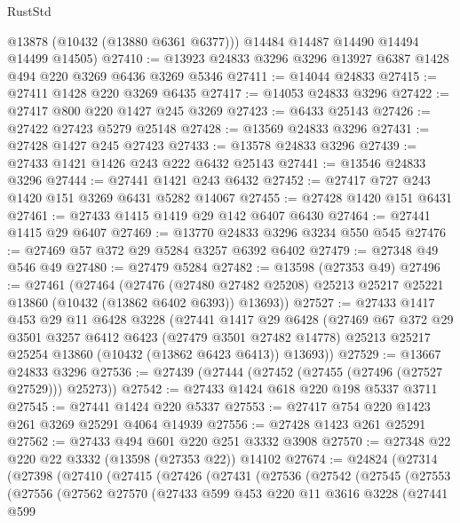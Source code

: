 \begin{lexlean}{RustStd}
\begin{coremodule}
        @13878
        (@10432 (@13880 @6361 @6377)))
      @14484
      @14487
      @14490
      @14494
      @14499
      @14505)
@27410 := @13923 @24833 @3296 @3296 @13927 @6387 @1428 @494 @220 @3269 @6436 @3269 @5346
@27411 := @14044 @24833
@27415 := @27411 @1428 @220 @3269 @6435
@27417 := @14053 @24833 @3296
@27422 := @27417 @800 @220 @1427 @245 @3269
@27423 := @6433 @25143
@27426 := @27422 @27423 @5279 @25148
@27428 := @13569 @24833 @3296
@27431 := @27428 @1427 @245 @27423
@27433 := @13578 @24833 @3296
@27439 := @27433 @1421 @1426 @243 @222 @6432 @25143
@27441 := @13546 @24833 @3296
@27444 := @27441 @1421 @243 @6432
@27452 := @27417 @727 @243 @1420 @151 @3269 @6431 @5282 @14067
@27455 := @27428 @1420 @151 @6431
@27461 := @27433 @1415 @1419 @29 @142 @6407 @6430
@27464 := @27441 @1415 @29 @6407
@27469 := @13770 @24833 @3296 @3234 @550 @545
@27476 := @27469 @57 @372 @29 @5284 @3257 @6392 @6402
@27479 := @27348 @49 @546 @49
@27480 := @27479 @5284
@27482 := @13598 (@27353 @49)
@27496 := @27461
    (@27464
      (@27476
        (@27480 @27482 @25208)
        @25213
        @25217
        @25221
        @13860
        (@10432 (@13862 @6402 @6393))
        @13693))
@27527 := @27433
    @1417
    @453
    @29
    @11
    @6428
    @3228
    (@27441
      @1417
      @29
      @6428
      (@27469
        @67
        @372
        @29
        @3501
        @3257
        @6412
        @6423
        (@27479 @3501 @27482 @14778)
        @25213
        @25217
        @25254
        @13860
        (@10432 (@13862 @6423 @6413))
        @13693))
@27529 := @13667 @24833 @3296
@27536 := @27439 (@27444 (@27452 (@27455 (@27496 (@27527 @27529))) @25273))
@27542 := @27433 @1424 @618 @220 @198 @5337 @3711
@27545 := @27441 @1424 @220 @5337
@27553 := @27417 @754 @220 @1423 @261 @3269 @25291 @4064 @14939
@27556 := @27428 @1423 @261 @25291
@27562 := @27433 @494 @601 @220 @251 @3332 @3908
@27570 := @27348 @22 @220 @22 @3332 (@13598 (@27353 @22)) @14102
@27674 := @24824
    (@27314
      (@27398
        (@27410
          (@27415
            (@27426
              (@27431
                (@27536
                  (@27542
                    (@27545
                      (@27553
                        (@27556
                          (@27562
                            @27570
                            (@27433
                              @599
                              @453
                              @220
                              @11
                              @3616
                              @3228
                              (@27441
                                @599

\end{coremodule}
\end{lexlean}
